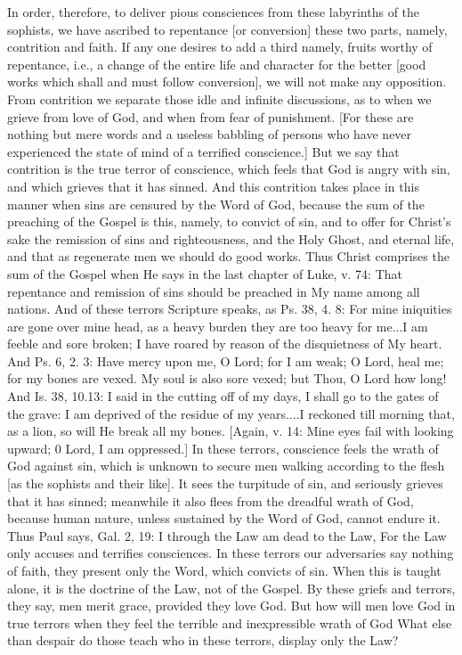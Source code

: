 In order, therefore, to deliver pious consciences from these
labyrinths of the sophists, we have ascribed to repentance [or
conversion] these two parts, namely, contrition and faith.  If any
one desires to add a third namely, fruits worthy of repentance, i.e.,
a change of the entire life and character for the better [good works
which shall and must follow conversion], we will not make any
opposition.  From contrition we separate those idle and infinite
discussions, as to when we grieve from love of God, and when from
fear of punishment.  [For these are nothing but mere words and a
useless babbling of persons who have never experienced the state of
mind of a terrified conscience.] But we say that contrition is the
true terror of conscience, which feels that God is angry with sin,
and which grieves that it has sinned.  And this contrition takes
place in this manner when sins are censured by the Word of God,
because the sum of the preaching of the Gospel is this, namely, to
convict of sin, and to offer for Christ's sake the remission of sins
and righteousness, and the Holy Ghost, and eternal life, and that as
regenerate men we should do good works.  Thus Christ comprises the
sum of the Gospel when He says in the last chapter of Luke, v. 74:
That repentance and remission of sins should be preached in My name
among all nations.  And of these terrors Scripture speaks, as Ps. 38,
4. 8: For mine iniquities are gone over mine head, as a heavy burden
they are too heavy for me...I am feeble and sore broken; I have
roared by reason of the disquietness of My heart.  And Ps. 6, 2. 3:
Have mercy upon me, O Lord; for I am weak; O Lord, heal me; for my
bones are vexed.  My soul is also sore vexed; but Thou, O Lord how
long!  And Is. 38, 10.13: I said in the cutting off of my days, I
shall go to the gates of the grave: I am deprived of the residue of
my years....I reckoned till morning that, as a lion, so will He break
all my bones.  [Again, v. 14: Mine eyes fail with looking upward; 0
Lord, I am oppressed.] In these terrors, conscience feels the wrath
of God against sin, which is unknown to secure men walking according
to the flesh [as the sophists and their like].  It sees the turpitude
of sin, and seriously grieves that it has sinned; meanwhile it also
flees from the dreadful wrath of God, because human nature, unless
sustained by the Word of God, cannot endure it.  Thus Paul says, Gal.
2, 19: I through the Law am dead to the Law, For the Law only accuses
and terrifies consciences.  In these terrors our adversaries say
nothing of faith, they present only the Word, which convicts of sin.
When this is taught alone, it is the doctrine of the Law, not of the
Gospel.  By these griefs and terrors, they say, men merit grace,
provided they love God.  But how will men love God in true terrors
when they feel the terrible and inexpressible wrath of God What else
than despair do those teach who in these terrors, display only the
Law?

